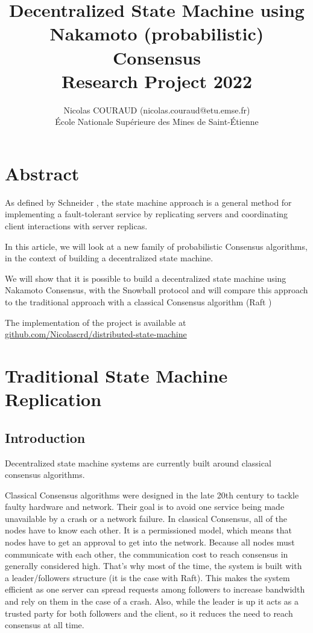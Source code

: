 \documentclass[11pt, twocolumn]{article}
\title{Decentralized State Machine using Nakamoto (probabilistic) Consensus\\\medskip Research Project 2022}
\author{Nicolas COURAUD (nicolas.couraud@etu.emse.fr)\\École Nationale Supérieure des Mines de Saint-Étienne}
\begin{document}
\maketitle
\onecolumn
\section*{Abstract}

As defined by Schneider \cite{stateMachine}, the state machine approach is a general method for implementing a fault-tolerant service
by replicating servers and coordinating client interactions with server replicas.

In this article, we will look at a new family of probabilistic Consensus algorithms, in the context of building a decentralized state machine.

We will show that it is possible to build a decentralized state machine using Nakamoto Consensus, with the Snowball protocol \cite{snowprotocol} and will compare this approach to the traditional approach with
a classical Consensus algorithm (Raft \cite{understandable})

The implementation of the project is available at \href{https://github.com/Nicolascrd/distributed-state-machine}{github.com/Nicolascrd/distributed-state-machine}


\tableofcontents

\section{Traditional State Machine Replication}

\subsection{Introduction}

Decentralized state machine systems are currently built around classical consensus algorithms.

Classical Consensus algorithms were designed in the late 20th century to tackle faulty hardware and network. Their goal is to avoid one service being made unavailable by a crash or a network failure.
In classical Consensus, all of the nodes have to know each other. It is a permissioned model, which means that nodes have to get an approval to get into the network.
Because all nodes must communicate with each other, the communication cost to reach consensus in generally considered high. That's why most of the time, the system is built with a leader/followers structure (it is the case with Raft).
This makes the system efficient as one server can spread requests among followers to increase bandwidth and rely on them in the case of a crash. Also, while the leader is up it acts as a trusted party for both followers and the client, so it reduces the need to reach consensus at all time.
\end{document}
